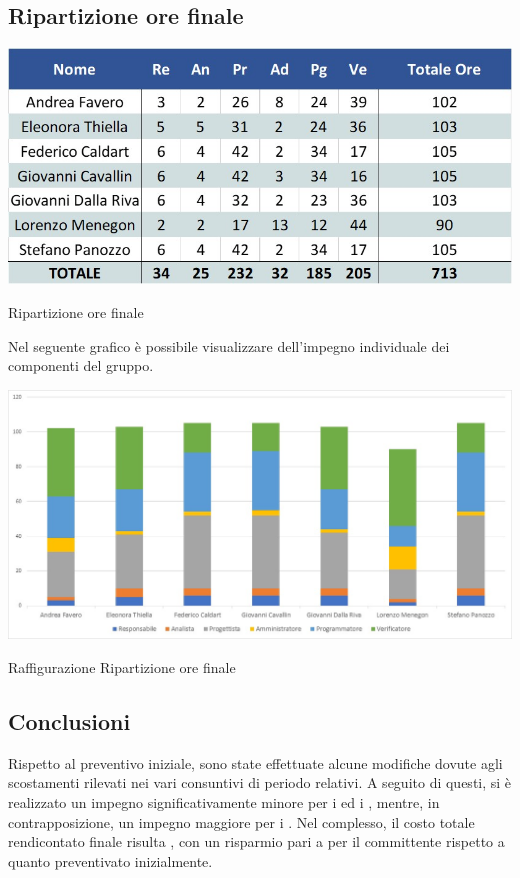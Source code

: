 \newpage
\subsection{Ripartizione ore finale}
\begin{table}[h!]
	\centerline{\includegraphics[scale=0.60]{img/Preventivo/Consuntivo/TotaleOre.jpg}}
	\caption{Ripartizione ore finale}
\end{table}

Nel seguente grafico è possibile visualizzare dell'impegno individuale dei componenti del gruppo.

\begin{table}[h!]
	\centerline{\includegraphics[scale=0.60]{img/Preventivo/Istogrammi/TotaleOre.jpg}}
	\caption{Raffigurazione Ripartizione ore finale}
\end{table}

\subsection{Conclusioni}
Rispetto al preventivo iniziale, sono state effettuate alcune modifiche dovute agli scostamenti rilevati nei vari consuntivi di periodo relativi. A seguito di questi, si è realizzato un impegno significativamente minore per i \progs{} ed i \vers{}, mentre, in contrapposizione, un impegno maggiore per i \progrs{}. Nel complesso, il costo totale rendicontato finale risulta , con un risparmio pari a  per il committente rispetto a quanto preventivato inizialmente.

